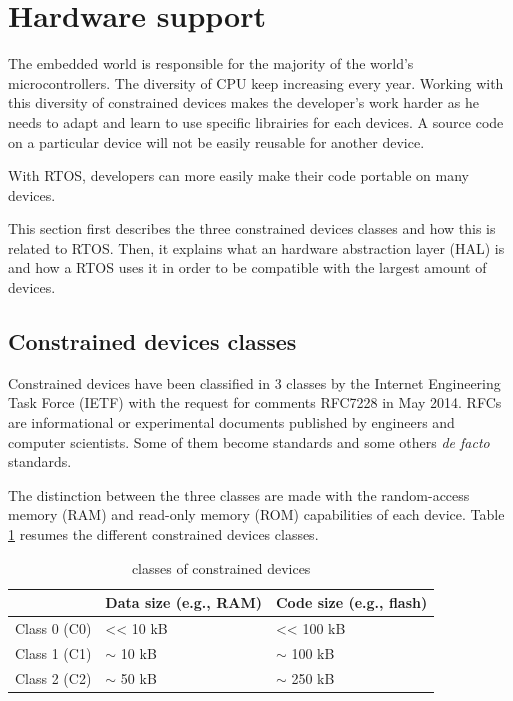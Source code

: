 \section{Hardware support}

The embedded world is responsible for the majority of the world's microcontrollers.
The diversity of CPU keep increasing every year.
Working with this diversity of constrained devices makes the developer's work harder as he needs to adapt and learn to use specific librairies for each devices.
A source code on a particular device will not be easily reusable for another device.

With RTOS, developers can more easily make their code portable on many devices.

This section first describes the three constrained devices classes and how this is related to RTOS.
Then, it explains what an hardware abstraction layer (HAL) is and how a RTOS uses it in order to be compatible with the largest amount of devices.

\subsection{Constrained devices classes}

Constrained devices have been classified in 3 classes by the Internet Engineering Task Force (IETF) with the request for comments RFC7228 in May 2014.
RFCs are informational or experimental documents published by engineers and computer scientists.
Some of them become standards and some others \textit{de facto} standards.

The distinction between the three classes are made with the random-access memory (RAM) and read-only memory (ROM) capabilities of each device.
Table \ref{tab:constrained-devices-classes} resumes the different constrained devices classes.

\begin{table}[!h]
  \centering
  \begin{tabular}{|l|l|l|}
  \hline
   & Data size (e.g., RAM) & Code size (e.g., flash) \\ \hline
  Class 0 (C0) & \textless{}\textless{} 10 kB & \textless{}\textless{} 100 kB \\ %
  Class 1 (C1) & $\sim$ 10 kB & $\sim$ 100 kB \\ %
  Class 2 (C2) & $\sim$ 50 kB & $\sim$ 250 kB \\ \hline
  \end{tabular}
  \caption{classes of constrained devices}
  \label{tab:constrained-devices-classes}
\end{table}

